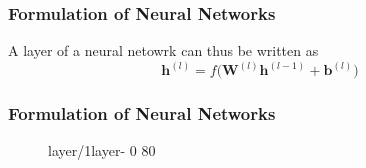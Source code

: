 \documentclass{beamer}
\begin{document}
\begin{frame}
\frametitle{Formulation of Neural Networks}
\begin{tcolorbox}
[colback=blue!5!white,colframe=blue!75!black,title=A Layer of the Neural Network]
A layer of a neural netowrk can thus be written as 
\begin{equation}
    \mathbf{h}^{(l)} = f\bigl(\mathbf{W}^{(l)}\mathbf{h}^{(l-1)}+\mathbf{b}^{(l)}\bigr)
\end{equation}
\end{tcolorbox}
\end{frame}
\begin{frame}
\frametitle{Formulation of Neural Networks}
\begin{figure}
    \centering
    {layer/1layer-}%
    {0}%
    {80}%
\end{figure}

\end{frame}
\end{document}

